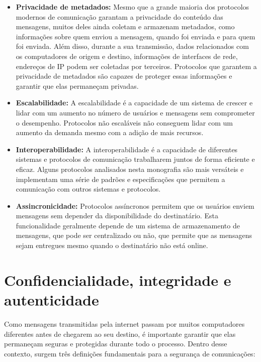 \begin{itemize}
    \item \textbf{Privacidade de metadados:} Mesmo que a grande maioria dos protocolos modernos de comunicação garantam a privacidade do conteúdo das mensagens, muitos deles ainda coletam e armazenam metadados, como informações sobre quem enviou a mensagem, quando foi enviada e para quem foi enviada. Além disso, durante a sua transmissão, dados relacionados com os computadores de origem e destino, informações de interfaces de rede, endereços de IP podem ser coletadas por terceiros. Protocolos que garantem a privacidade de metadados são capazes de proteger essas informações e garantir que elas permaneçam privadas.
    
    \item \textbf{Escalabilidade:} A escalabilidade é a capacidade de um sistema de crescer e lidar com um aumento no número de usuários e mensagens sem comprometer o desempenho. Protocolos não escaláveis não conseguem lidar com um aumento da demanda mesmo com a adição de mais recursos.
    
    \item \textbf{Interoperabilidade:} A interoperabilidade é a capacidade de diferentes sistemas e protocolos de comunicação trabalharem juntos de forma eficiente e eficaz. Alguns protocolos analisados nesta monografia são mais versáteis e implementam uma série de padrões e especificações que permitem a comunicação com outros sistemas e protocolos.

    \item \textbf{Assincronicidade:} Protocolos assíncronos permitem que os usuários enviem mensagens sem depender da disponibilidade do destinatário. Esta funcionalidade geralmente depende de um sistema de armazenamento de mensagens, que pode ser centralizado ou não, que permite que as mensagens sejam entregues mesmo quando o destinatário não está online.
\end{itemize}

\section{Confidencialidade, integridade e autenticidade}

Como mensagens transmitidas pela internet passam por muitos computadores diferentes antes de chegarem ao seu destino, é importante garantir que elas permaneçam seguras e protegidas durante todo o processo. Dentro desse contexto, surgem três definições fundamentais para a segurança de comunicações:

